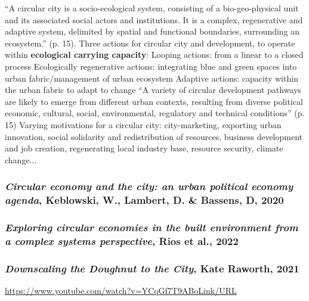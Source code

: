 \documentclass{article}
\begin{document}
\begin{outline}
	\1 ``A circular city is a socio-ecological system, consisting of a bio-geo-physical unit and its associated social actors and institutions. It is a complex, regenerative and adaptive system, delimited by spatial and functional boundaries, surrounding an ecosystem.'' (p. 15). Three actions for circular city and development, to operate within \textbf{ecological carrying capacity}:
		\2 Looping actions: from a linear to a closed process
		\2 Ecologically regenerative actions: integrating blue and green spaces into urban fabric/management of urban ecosystem
		\2 Adaptive actions: capacity within the urban fabric to adapt to change
	\1 ``A variety of circular development pathways are likely to emerge from different urban contexts, resulting from diverse political economic, cultural, social, environmental, regulatory and technical conditions'' (p. 15)
	\1 Varying motivations for a circular city: city-marketing, exporting urban innovation, social solidarity and redistribution of resources, business development and job creation, regenerating local industry base, resource security, climate change... 
\end{outline}

\subsubsection{\textit{Circular economy and the city: an urban political economy agenda}, Keblowski, W., Lambert, D. \& Bassens, D, 2020}

\begin{outline}
	\1 
\end{outline}

\subsubsection{\textit{Exploring circular economies in the built environment from a complex systems perspective}, Rios et al., 2022}

\begin{outline}
	\1 
\end{outline}

\subsubsection{\textit{Downscaling the Doughnut to the City}, Kate Raworth, 2021}

\url{https://www.youtube.com/watch?v=YCqGf7T9ABoLink/URL}
\end{document}
